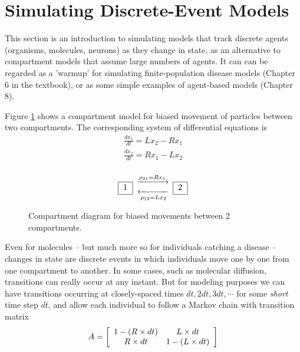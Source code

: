 \documentclass [11pt]{article}
\numberwithin{exercise}{section}
\begin{document}
\section{Simulating Discrete-Event Models} 
This section is an introduction to simulating models that track discrete
agents (organisms, molecules, neurons) as they change in state, as an
alternative to compartment models that assume large numbers of agents. It can 
can be regarded as a 'warmup' for simulating finite-population disease models
(Chapter 6 in the textbook), or as some simple examples of agent-based models 
(Chapter 8).  

Figure \ref{Cdiagram} shows a compartment model for biased movement of particles
between two compartments. The corresponding system of differential equations is 
\begin{equation}
\begin{array}{l}
\frac{dx_1}{dt} = Lx_2 - Rx_1 \\ 
\frac{dx_2}{dt} = Rx_1 - Lx_2 \\ 
\end{array}
\end{equation}

\begin{figure}[ht]
\LARGE
\[
\boxed{\;1^{ }_{ }\;}\begin{array}{*{20}c}
   {\xrightarrow{{\rho _{21}  = Rx_1 }}}  \\
   {\xleftarrow[{\rho _{12}  = Lx_2 }]{}}  \\
 \end{array} \boxed{\;2^{}_{}\;}
\]
\normalsize
\caption{Compartment diagram for biased movements between 2 compartments.}
\label{Cdiagram}
\end{figure}

Even for molecules -- but much more so for individuals catching a disease --  
changes in state are discrete events in which individuals move one by one  
from one compartment to another. In some cases, such as molecular diffusion, 
transitions can really occur at any instant. But for modeling purposes we can have  
transitions occurring at closely-spaced times $dt, 2dt, 3dt, \cdots$ for 
some \textit{short} time step $dt$, and allow each individual to follow a 
Markov chain with transition matrix 
\begin{equation*}
A = \left[ {\begin{array}{*{20}c}
   {1 - (R \times dt)} & {L \times dt}  \\
   {R \times dt} & {1 - (L\times dt)}  \\

 \end{array} } \right]
\end{equation*}
\end{document}
